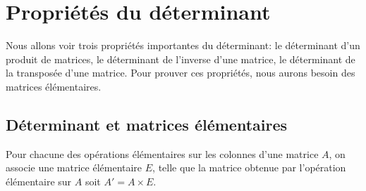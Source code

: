 \documentclass[class=report,crop=false]{standalone}
\begin{document}
\section{Propriétés du déterminant}

Nous allons voir trois propriétés importantes du déterminant:
le déterminant d'un produit de matrices, le déterminant de l'inverse d'une matrice,
le déterminant de la transposée d'une matrice.
Pour prouver ces propriétés, nous aurons besoin
des matrices élémentaires.


\subsection{Déterminant et matrices élémentaires}

Pour chacune des opérations élémentaires sur les colonnes d'une matrice $A$,
on associe une matrice élémentaire $E$, telle que la matrice
obtenue par l'opération élémentaire sur $A$ soit $A'=A\times E$.
\end{document}
